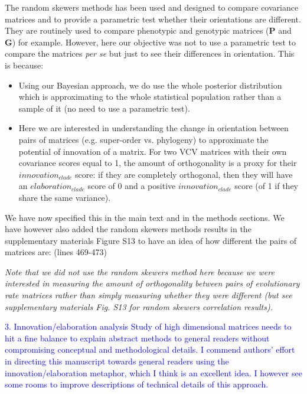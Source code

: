 \documentclass[12pt,letterpaper]{article}
\begin{document}
{The random skewers methods has been used and designed to compare covariance matrices and to provide a parametric test whether their orientations are different. They are routinely used to compare phenotypic and genotypic matrices (\textbf{P} and \textbf{G}) for example. However, here our objective was not to use a parametric test to compare the matrices \textit{per se} but just to see their differences in orientation. This is because:
\begin{itemize}
\item Using our Bayesian approach, we do use the whole posterior distribution which is approximating to the whole statistical population rather than a sample of it (no need to use a parametric test).
\item Here we are interested in understanding the change in orientation between pairs of matrices (e.g. super-order vs. phylogeny) to approximate the potential of innovation of a matrix. For two VCV matrices with their own covariance scores equal to 1, the amount of orthogonality is a proxy for their $innovation_{clade}$ score: if they are completely orthogonal, then they will have an $elaboration_{clade}$ score of 0 and a positive $innovation_{clade}$ score (of 1 if they share the same variance). 
\end{itemize}
We have now specified this in the main text and in the methods sections. We have however also added the random skewers methods results in the supplementary materials Figure S13 to have an idea of how different the pairs of matrices are: (lines 469-473)

\noindent\textit{Note that we did not use the random skewers method here \cite{cheverud2007research} because we were interested in measuring the amount of orthogonality between pairs of evolutionary rate matrices rather than simply measuring whether they were different (but see supplementary materials Fig. S13 for random skewers correlation results).} %


\textcolor{blue}{3. Innovation/elaboration analysis
Study of high dimensional matrices needs to hit a fine balance to explain abstract methods to general readers without compromising conceptual and methodological details. I commend authors’ effort in directing this manuscript towards general readers using the innovation/elaboration metaphor, which I think is an excellent idea. I however see some rooms to improve descriptions of technical details of this approach.}

}
\end{document}
